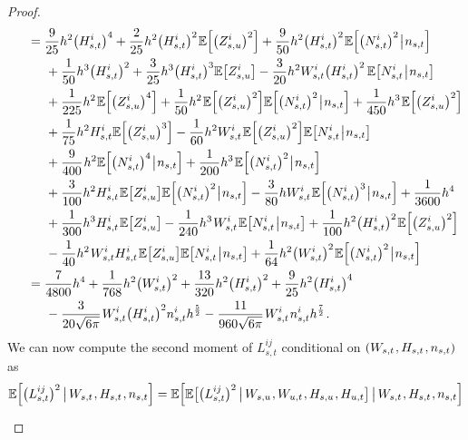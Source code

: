 \documentclass[sn-mathphys-num]{sn-jnl}%
\newcommand{\E}{\mathbb{E}}
\newcommand{\m}{\hspace{0.25mm}}
\newcommand{\mm}{\hspace{5mm}}
\newcommand{\mmm}{\hspace{10mm}}
\begin{document}
\begin{proof}
\begin{align*}
&\mm = \frac{9}{25}h^2\big(H_{s,t}^i\big)^4 + \frac{2}{25}h^2\big(H_{s,t}^i\big)^2\m\E\Big[\big(Z_{s,u}^i\big)^2\Big] + \frac{9}{50}h^2\big(H_{s,t}^i\big)^2\m\E\Big[\big(N_{s,t}^i\big)^2\m\big|\m n_{s,t}\Big] \\
&\mmm + \frac{1}{50}h^3\big(H_{s,t}^i\big)^2 + \frac{3}{25}h^3\big(H_{s,t}^i\big)^3 \E\big[Z_{s,u}^i\big] - \frac{3}{20}h^2 W_{s,t}^i\big(H_{s,t}^i\big)^2\,\E\big[N_{s,t}^i\m\big|\m n_{s,t}\big]\\
&\mmm + \frac{1}{225}h^2\m\E\Big[\big(Z_{s,u}^i\big)^4\Big] + \frac{1}{50}h^2\m\E\Big[\big(Z_{s,u}^i\big)^2\Big]\E\Big[\big(N_{s,t}^i\big)^2\m\big|\m n_{s,t}\Big] + \frac{1}{450}h^3\m\E\Big[\big(Z_{s,u}^i\big)^2\Big] \\
&\mmm + \frac{1}{75}h^2 H_{s,t}^i\E\Big[\big(Z_{s,u}^i\big)^3\Big] - \frac{1}{60}h^2 W_{s,t}^i\m \E\Big[\big(Z_{s,u}^i\big)^2\Big]\E\big[N_{s,t}^i\m\big|\m n_{s,t}\big]\\
&\mmm + \frac{9}{400}\m h^2\E\Big[\big(N_{s,t}^i\big)^4\m\big|\m n_{s,t}\Big] + \frac{1}{200}h^3\m\E\Big[\big(N_{s,t}^i\big)^2\m\big|\m n_{s,t}\Big]\\
&\mmm + \frac{3}{100}h^2 H_{s,t}^i \m\E\big[Z_{s,u}^i\big]\E\Big[\big(N_{s,t}^i\big)^2\m\big|\m n_{s,t}\Big] - \frac{3}{80}h W_{s,t}^i\m \E\Big[\big(N_{s,t}^i\big)^3\m\big|\m n_{s,t}\Big] + \frac{1}{3600}h^4 \\
&\mmm + \frac{1}{300}h^3 H_{s,t}^i\m \E\big[Z_{s,u}^i\big] - \frac{1}{240} h^3\m W_{s,t}^i\m\E\big[N_{s,t}^i\m\big|\m n_{s,t}\big] + \frac{1}{100}h^2 \big(H_{s,t}^i\big)^2\m\E\Big[\big(Z_{s,u}^i\big)^2\Big]\\
&\mmm - \frac{1}{40} h^2\m W_{s,t}^i H_{s,t}^i\m \E\big[Z_{s,u}^i\big]\E\big[N_{s,t}^i\m\big|\m n_{s,t}\big] + \frac{1}{64}h^2\big(W_{s,t}^i\big)^2\m\E\Big[\big(N_{s,t}^i\big)^2\m\big|\m n_{s,t}\Big]\\
&\mm = \frac{7}{4800}h^4 + \frac{1}{768}h^2\big(W_{s,t}^i\big)^2 + \frac{13}{320}h^2\big(H_{s,t}^i\big)^2 + \frac{9}{25}h^2\big(H_{s,t}^i\big)^4\\
&\mmm - \frac{3}{20\sqrt{6\pi}}\m W_{s,t}^i\big(H_{s,t}^i\big)^2 n_{s,t}^i h^\frac{5}{2} - \frac{11}{960\sqrt{6\pi}}\m W_{s,t}^i\m n_{s,t}^i h^\frac{7}{2}\m.
\end{align*}
We can now compute the second moment of $L_{s,t}^{ij}$ conditional on $(W_{s,t}\m, H_{s,t}\m, n_{s,t})$ as
\begin{align*}
\E\Big[\big(L_{s,t}^{ij}\big)^2\,\big|\, W_{s,t}\m, H_{s,t}\m, n_{s,t}\Big]
& = \E\Big[\E\big[\big(L_{s,t}^{ij}\big)^2\,\big|\, W_{s,u}\m, W_{u,t}\m, H_{s,u}\m, H_{u,t}\big]\,\big|\, W_{s,t}\m, H_{s,t}\m, n_{s,t}\Big]\\[3pt]

\end{align*}
\end{proof}
\end{document}
